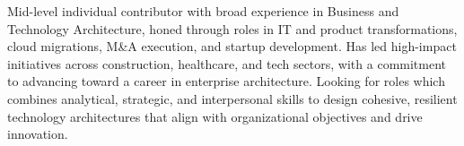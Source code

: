 

\begin{cvparagraph}

Mid-level individual contributor with broad experience in Business and Technology Architecture, honed through roles in IT and product transformations, cloud migrations, M\&A execution, and startup development. Has led high-impact initiatives across construction, healthcare, and tech sectors, with a commitment to advancing toward a career in enterprise architecture. Looking for roles which combines analytical, strategic, and interpersonal skills to design cohesive, resilient technology architectures that align with organizational objectives and drive innovation.
\end{cvparagraph}